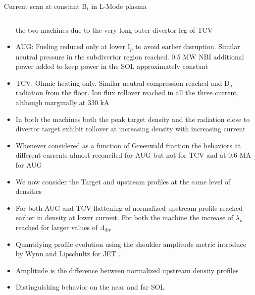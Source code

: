 \documentclass[10pt, compress]{beamer}
\begin{document}
\begin{frame}{Current scan at constant B$_t$ in L-Mode plasma}
\begin{columns}
\begin{column}{0.4\textwidth}
\begin{itemize}
          the two machines due to the very long outer divertor leg of TCV
        \item<2|only@2> AUG: Fueling reduced only at lower I$_p$ to
          avoid earlier disruption. Similar neutral pressure in the
          subdivertor region reached. 0.5 MW NBI additional power added to
          keep power in the SOL approximately constant
        \item<3|only@3> TCV: Ohmic heating only. Similar neutral compression reached and
          D$_{\alpha}$ radiation from the floor. Ion flux rollover
          reached in all the three current,  although marginally at
          330 kA
        \item<4|only@4> In both the machines both the peak target
          density and the radiation close to divertor target exhibit
          rollover at increasing density with increasing current
        \item<5|only@5> Whenever considered as a function of
          Greenwald fraction the behaviors at different currents
          almost reconciled for AUG \alert{but not for TCV and at 0.6
            MA for AUG}
        \item<only@6-7> We now consider the Target and upstream
          profiles at the same level of densities  
        \item<only@7> For both AUG and TCV flattening of normalized
          upstream profile reached \alert{earlier in density at lower
            current.} For both the machine the increase of $\lambda_n$
          reached for larger values of $\Lambda_{div}$
        \item<only@8> Quantifying profile evolution using the
          \alert{shoulder amplitude metric} introduce by Wynn and
          Lipschultz for JET \parencite{Wynn:2018gp}.
        \item<only@8>  \alert{Amplitude is the difference
            between normalized upstream density profiles}
        \item<only@8> Distinguishing behavior on the near and far SOL  
\end{itemize}
\end{column}
\end{columns}
\end{frame}
\end{document}
